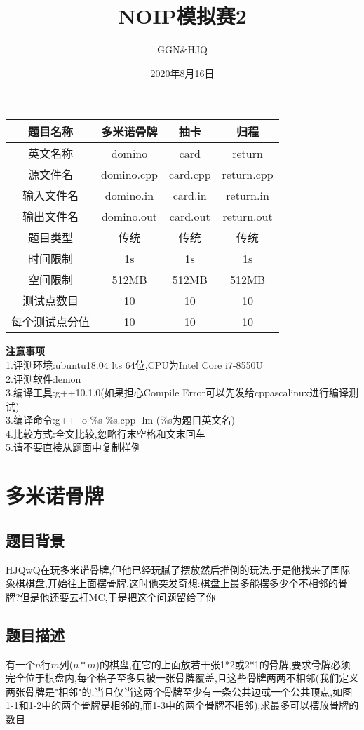 \documentclass[12pt]{ctexart}
\title{\textbf{NOIP模拟赛2}}
\author{GGN\&HJQ}
\date{2020年8月16日}
\begin{document}
\maketitle
\begin{center}
	\begin{tabular}{|c|c|c|c|}
		\hline 题目名称&多米诺骨牌&抽卡&归程\\
		\hline 英文名称&domino&card&return\\
		\hline 源文件名&domino.cpp&card.cpp&return.cpp\\
		\hline 输入文件名&domino.in&card.in&return.in\\
		\hline 输出文件名&domino.out&card.out&return.out\\
		\hline 题目类型&传统&传统&传统\\
		\hline 时间限制&1s&1s&1s\\
		\hline 空间限制&512MB&512MB&512MB\\
		\hline 测试点数目&10&10&10\\
		\hline 每个测试点分值&10&10&10\\
		\hline
	\end{tabular}
\end{center}
\textbf{注意事项}\\
1.评测环境:ubuntu18.04 lts 64位,CPU为Intel Core i7-8550U\\
2.评测软件:lemon\\
3.编译工具:g++10.1.0(如果担心Compile Error可以先发给cppascalinux进行编译测试)\\
3.编译命令:g++ -o \%s \%s.cpp -lm (\%s为题目英文名)\\
4.比较方式:全文比较,忽略行末空格和文末回车\\
5.请不要直接从题面中复制样例
\newpage
\section{多米诺骨牌}
\subsection{题目背景}
HJQwQ在玩多米诺骨牌,但他已经玩腻了摆放然后推倒的玩法.于是他找来了国际象棋棋盘,开始往上面摆骨牌.这时他突发奇想:棋盘上最多能摆多少个不相邻的骨牌?但是他还要去打MC,于是把这个问题留给了你
\subsection{题目描述}
有一个$n$行$m$列($n*m$)的棋盘,在它的上面放若干张1*2或2*1的骨牌,要求骨牌必须完全位于棋盘内,每个格子至多只被一张骨牌覆盖,且这些骨牌两两不相邻(我们定义两张骨牌是"相邻"的,当且仅当这两个骨牌至少有一条公共边或一个公共顶点,如图1-1和1-2中的两个骨牌是相邻的,而1-3中的两个骨牌不相邻),求最多可以摆放骨牌的数目
\end{document}
